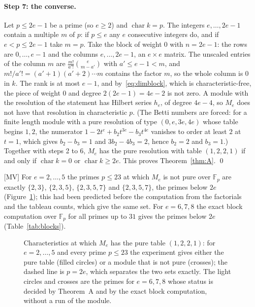 \documentclass[11pt]{article}
\theoremstyle{definition}
\theoremstyle{remark}
\newcommand{\F}{\mathbb{F}}
\newcommand{\ch}{\operatorname{char}}
\begin{document}
\paragraph{Step 7: the converse.} Let $p\le2e-1$ be a prime (so $e\ge2$) and $\ch k=p$. The integers $e,\dots,2e-1$ contain a multiple $m$ of $p$: if $p\le e$ any $e$ consecutive integers do, and if $e<p\le2e-1$ take $m=p$. Take the block of weight $0$ with $n=2e-1$: the rows are $0,\dots,e-1$ and the columns $e,\dots,2e-1$, an $e\times e$ matrix. The unscaled entries of the column $m$ are $\frac{m!}{a'!}\binom e{m-a'}$ with $a'\le e-1<m$, and $m!/a'!=(a'+1)(a'+2)\cdots m$ contains the factor $m$, so the whole column is $0$ in $k$. The rank is at most $e-1$, and by~\eqref{eq:dimblock}, which is characteristic-free, the piece of weight $0$ and degree $2(2e-1)=4e-2$ is not zero. A module with the resolution of the statement has Hilbert series $h_e$, of degree $4e-4$, so $M_e$ does not have that resolution in characteristic $p$. (The Betti numbers are forced: for a finite length module with a pure resolution of type $(0,e,3e,4e)$ whose table begins $1,2$, the numerator $1-2t^e+b_2t^{3e}-b_3t^{4e}$ vanishes to order at least $2$ at $t=1$, which gives $b_2-b_3=1$ and $3b_2-4b_3=2$, hence $b_2=2$ and $b_3=1$.) Together with steps 2 to 6, $M_e$ has the pure resolution with table $(1,2,2,1)$ if and only if $\ch k=0$ or $\ch k\ge2e$. This proves Theorem~\ref{thm:A}. \qed

[MV] For $e=2,\dots,5$ the primes $p\le23$ at which $M_e$ is not pure over $\F_p$ are exactly $\{2,3\}$, $\{2,3,5\}$, $\{2,3,5,7\}$ and $\{2,3,5,7\}$, the primes below $2e$ (Figure~\ref{fig:primes}); this had been predicted before the computation from the factorials and the tableau counts, which give the same set. For $e=6,7,8$ the exact block computation over $\F_p$ for all primes up to $31$ gives the primes below $2e$ (Table~\ref{tab:blocks}).

\begin{figure}[htbp]
\centering

\caption{Characteristics at which $M_e$ has the pure table $(1,2,2,1)$: for $e=2,\dots,5$ and every prime $p\le23$ the experiment gives either the pure table (filled circles) or a module that is not pure (crosses); the dashed line is $p=2e$, which separates the two sets exactly. The light circles and crosses are the primes for $e=6,7,8$ whose status is decided by Theorem~A and by the exact block computation, without a run of the module.}
\label{fig:primes}
\end{figure}
\end{document}
